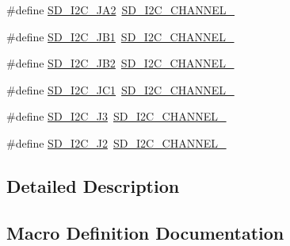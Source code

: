 \begin{DoxyCompactItemize}
\item 
\#define \mbox{\hyperlink{group___s_d___i2_c___defines_ga0f83f6a50adc5d44b54240576f101120}{S\+D\+\_\+\+I2\+C\+\_\+\+J\+A2}}~\mbox{\hyperlink{group___s_d___i2_c___defines_gaad221fbeeafbe7801d16c980eb7110ca}{S\+D\+\_\+\+I2\+C\+\_\+\+C\+H\+A\+N\+N\+E\+L\+\_}}
\item 
\#define \mbox{\hyperlink{group___s_d___i2_c___defines_ga03d2c2b4bee078e7fc84488d9d765052}{S\+D\+\_\+\+I2\+C\+\_\+\+J\+B1}}~\mbox{\hyperlink{group___s_d___i2_c___defines_ga663660f8e86f6e4194abe4ec5003d443}{S\+D\+\_\+\+I2\+C\+\_\+\+C\+H\+A\+N\+N\+E\+L\+\_}}
\item 
\#define \mbox{\hyperlink{group___s_d___i2_c___defines_ga57cfdb9dfadadc9f672c9852af67bdf5}{S\+D\+\_\+\+I2\+C\+\_\+\+J\+B2}}~\mbox{\hyperlink{group___s_d___i2_c___defines_ga7620821989cd1145949c036be14dbcd6}{S\+D\+\_\+\+I2\+C\+\_\+\+C\+H\+A\+N\+N\+E\+L\+\_}}
\item 
\#define \mbox{\hyperlink{group___s_d___i2_c___defines_ga558d6ba622398f9e5618b6dc983945f3}{S\+D\+\_\+\+I2\+C\+\_\+\+J\+C1}}~\mbox{\hyperlink{group___s_d___i2_c___defines_gaa0f1a3a019f024dc10a3a4025cdb2830}{S\+D\+\_\+\+I2\+C\+\_\+\+C\+H\+A\+N\+N\+E\+L\+\_}}
\item 
\#define \mbox{\hyperlink{group___s_d___i2_c___defines_gaf1e13fcf962f7b34314d580f869539c9}{S\+D\+\_\+\+I2\+C\+\_\+\+J3}}~\mbox{\hyperlink{group___s_d___i2_c___defines_ga0b586488f6f2252262b412db53e9008f}{S\+D\+\_\+\+I2\+C\+\_\+\+C\+H\+A\+N\+N\+E\+L\+\_}}
\item 
\#define \mbox{\hyperlink{group___s_d___i2_c___defines_gae83d6a783674f5c291725a70c3ab25b6}{S\+D\+\_\+\+I2\+C\+\_\+\+J2}}~\mbox{\hyperlink{group___s_d___i2_c___defines_ga26027bd1cdd514db775ea1bd71c0a6e5}{S\+D\+\_\+\+I2\+C\+\_\+\+C\+H\+A\+N\+N\+E\+L\+\_}}
\end{DoxyCompactItemize}


\subsection{Detailed Description}


\subsection{Macro Definition Documentation}
\mbox{\label{group___s_d___i2_c___defines_ga0c16c172eb6fa64283ba01884a5d0831}} 
